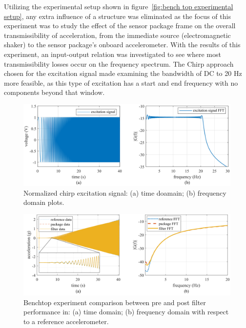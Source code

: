 \documentclass[]{spie}  %
\begin{document}
	
	Utilizing the experimental setup shown in figure~\ref{fig:bench top experimental setup}, any extra influence of a structure was eliminated as the focus of this experiment was to study the effect of the sensor package frame on the overall transmissibility of acceleration, from the immediate source (electromagnetic shaker) to the sensor package's onboard accelerometer. With the results of this experiment, an input-output relation was investigated to see where most transmissibility losses occur on the frequency spectrum. The Chirp approach chosen for the excitation signal made examining the bandwidth of DC to 20 Hz more feasible, as this type of excitation has a start and end frequency with no components beyond that window.
	
	\begin{figure} [H]
		\centering
		\includegraphics[width=6 in]{figures/excitation signal Time and Frequency domain chirp plot.png}
		\caption{Normalized chirp excitation signal: (a) time doamain; (b) frequency domain plots.} 
		\label{fig:excitation signal Time and Frequency domain chirp plot} 
	\end{figure}

	\begin{figure} [H]
		\centering
		\includegraphics[width=6 in]{figures/Chirp Benchtop Filtered.png}
		\caption{Benchtop experiment comparison between pre and post filter performance in: (a) time domain; (b) frequency domain with respect to a reference accelerometer.} 
		\label{fig:excitation signal plot} 
	\end{figure}
	
\end{document}
